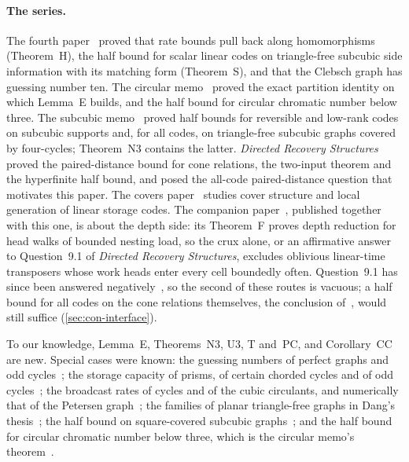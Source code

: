 \paragraph{The series.} The fourth paper~\cite{FourthPaper2026} proved that rate bounds pull back along homomorphisms
(Theorem~H), the half bound for scalar linear codes on triangle-free subcubic side information with its matching form
(Theorem~S), and that the Clebsch graph has guessing number ten. The circular memo~\cite{CircularMemo2026} proved the
exact partition identity on which Lemma~E builds, and the half bound for circular chromatic number below three. The
subcubic memo~\cite{SubcubicMemo2026} proved half bounds for reversible and low-rank codes on subcubic supports and, for
all codes, on triangle-free subcubic graphs covered by four-cycles; Theorem~N3 contains the latter. \emph{Directed
Recovery Structures}~\cite{DirectedRecovery2026} proved the paired-distance bound for cone relations, the two-input theorem
and the hyperfinite half bound, and posed the all-code paired-distance question that motivates this paper. The covers
paper~\cite{Covers2026} studies cover structure and local generation of linear storage codes. The companion
paper~\cite{EighthPaper2026}, published together with this one, is about the depth side: its Theorem~F proves depth
reduction for head walks of bounded nesting load, so the crux alone, or an affirmative answer to Question~9.1 of
\emph{Directed Recovery Structures}, excludes oblivious linear-time transposers whose work heads enter every cell boundedly
often. Question~9.1 has since been answered negatively~\cite[Theorem~A]{StorageCodes2026}, so the second of these routes
is vacuous; a half bound for all codes on the cone relations themselves, the conclusion
of~\cite[Proposition~9.2]{DirectedRecovery2026}, would still suffice (\cref{sec:con-interface}).

To our knowledge, Lemma~E, Theorems~N3, U3, T and~PC, and Corollary~CC are new. Special cases were known: the guessing
numbers of perfect graphs and odd cycles~\cite{ChristofidesMarkstrom2011}; the storage capacity of prisms, of certain
chorded cycles and of odd cycles~\cite{MMV2019}; the broadcast rates of cycles and of the cubic circulants, and numerically
that of the Petersen graph~\cite{BKL2013}; the families of planar triangle-free graphs in Dang's thesis~\cite{Dang2015};
the half bound on square-covered subcubic graphs~\cite{SubcubicMemo2026}; and the half bound for circular chromatic number
below three, which is the circular memo's theorem~\cite{CircularMemo2026}.

